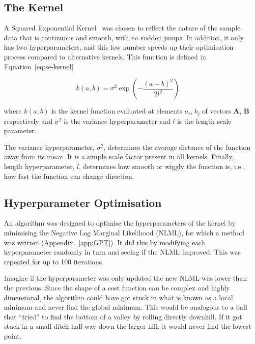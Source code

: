 \documentclass[12pt]{article}
\begin{document}
    \subsection{The Kernel}
    A Squared Exponential Kernel~\cite{duvenaud2014kernel} was chosen to reflect the nature of the sample data that is continuous and smooth, with no sudden jumps.
    In addition, it only has two hyperparameters, and this low number speeds up their optimisation process compared to alternative kernels.
    This function is defined in Equation~\ref{eq:se-kernel}

    \begin{equation}
        k(a,b) = \sigma^2 \exp\left(-\frac{(a - b)^2}{2l^2}\right) \label{eq:se-kernel}
    \end{equation}

    \noindent where $k(a,b)$ is the kernel function evaluated at elements $a_i$, $b_j$ of vectors $\mathbf{A}$, $\mathbf{B}$ respectively and $\sigma^2$ is the variance hyperparameter and $l$ is the length scale parameter.

    The variance hyperparameter, $\sigma^2$, determines the average distance of the function away from its mean.
    It is a simple scale factor present in all kernels.
    Finally, length hyperparameter, $l$, determines how smooth or wiggly the function is, i.e., how fast the function can change direction.

    \subsection{Hyperparameter Optimisation}
    An algorithm was designed to optimise the hyperparameters of the kernel by minimising the Negative Log Marginal Likelihood (NLML), for which a method was written (Appendix.~\ref{app:GPT}).
    It did this by modifying each hyperparameter randomly in turn and seeing if the NLML improved.
    This was repeated for up to 100 iterations.

    Imagine if the hyperparameter was only updated the new NLML was lower than the previous.
    Since the shape of a cost function can be complex and highly dimensional, the algorithm could have got stuck in what is known as a local minimum and never find the global minimum.
    This would be analogous to a ball that ``tried'' to find the bottom of a valley by rolling directly downhill.
    If it got stuck in a small ditch half-way down the larger hill, it would never find the lowest point.
\end{document}
